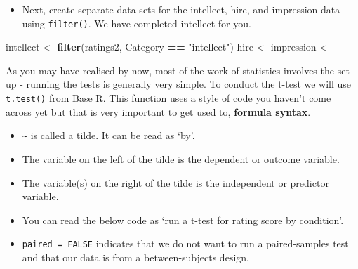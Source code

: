 \documentclass[]{book}
\newenvironment{Shaded}{\begin{snugshade}}{\end{snugshade}}
\newcommand{\DataTypeTok}[1]{\textcolor[rgb]{0.13,0.29,0.53}{#1}}
\newcommand{\KeywordTok}[1]{\textcolor[rgb]{0.13,0.29,0.53}{\textbf{#1}}}
\newcommand{\NormalTok}[1]{#1}
\newcommand{\OperatorTok}[1]{\textcolor[rgb]{0.81,0.36,0.00}{\textbf{#1}}}
\newcommand{\OtherTok}[1]{\textcolor[rgb]{0.56,0.35,0.01}{#1}}
\newcommand{\StringTok}[1]{\textcolor[rgb]{0.31,0.60,0.02}{#1}}
\providecommand{\tightlist}{%
  \setlength{\itemsep}{0pt}\setlength{\parskip}{0pt}}
\begin{document}
\begin{Shaded}
\end{Shaded}

\begin{itemize}
\tightlist
\item
  Next, create separate data sets for the intellect, hire, and impression data using \texttt{filter()}. We have completed intellect for you.
\end{itemize}

\begin{Shaded}
\begin{Highlighting}[]
\NormalTok{intellect <-}\StringTok{ }\KeywordTok{filter}\NormalTok{(ratings2, Category }\OperatorTok{==}\StringTok{ "intellect"}\NormalTok{)}
\NormalTok{hire <-}\StringTok{ }
\NormalTok{impression <-}\StringTok{ }
\end{Highlighting}
\end{Shaded}

As you may have realised by now, most of the work of statistics involves the set-up - running the tests is generally very simple. To conduct the t-test we will use \texttt{t.test()} from Base R. This function uses a style of code you haven't come across yet but that is very important to get used to, \textbf{formula syntax}.

\begin{Shaded}
\end{Shaded}

\begin{itemize}
\tightlist
\item
  \texttt{\textasciitilde{}} is called a tilde. It can be read as `by'.\\
\item
  The variable on the left of the tilde is the dependent or outcome variable.
\item
  The variable(s) on the right of the tilde is the independent or predictor variable.\\
\item
  You can read the below code as `run a t-test for rating score by condition'.
\item
  \texttt{paired\ =\ FALSE} indicates that we do not want to run a paired-samples test and that our data is from a between-subjects design.
\end{itemize}
\end{document}
